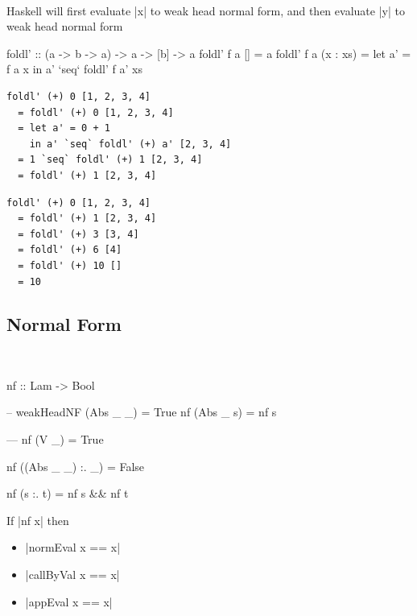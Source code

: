 \documentclass{beamer}
\begin{document}
\begin{frame}{\insertsectionhead\ \textemdash\\
    \insertsubsectionhead}
Haskell will first evaluate |x| to weak head normal form, and then
evaluate |y| to weak head normal form

\framebreak

\begin{code}
foldl' :: (a -> b -> a) -> a -> [b] -> a
foldl' f a [] = a
foldl' f a (x : xs) =
  let a' = f a x
   in a' `seq` foldl' f a' xs
\end{code}

\framebreak

\begin{lstlisting}
foldl' (+) 0 [1, 2, 3, 4]
  = foldl' (+) 0 [1, 2, 3, 4]
  = let a' = 0 + 1
    in a' `seq` foldl' (+) a' [2, 3, 4]
  = 1 `seq` foldl' (+) 1 [2, 3, 4]
  = foldl' (+) 1 [2, 3, 4]
\end{lstlisting}

\framebreak

\begin{lstlisting}
foldl' (+) 0 [1, 2, 3, 4]
  = foldl' (+) 1 [2, 3, 4]
  = foldl' (+) 3 [3, 4]
  = foldl' (+) 6 [4]
  = foldl' (+) 10 []
  = 10
\end{lstlisting}

\end{frame}

\subsection{Normal Form}
\begin{frame}{\insertsectionhead\ \textemdash\\
    \insertsubsectionhead}

\begin{code}
nf :: Lam -> Bool

-- weakHeadNF (Abs _ _) = True
nf (Abs _ s) = nf s

---
nf (V _) = True

nf ((Abs _ _) :. _) = False

nf (s :. t) = nf s && nf t
\end{code}

\framebreak
\begin{claim}
  If |nf x| then
  \begin{itemize}
    \item |normEval x == x|
    \item |callByVal x == x|
    \item |appEval x == x|
  \end{itemize}
\end{claim}
\end{frame}
\end{document}
